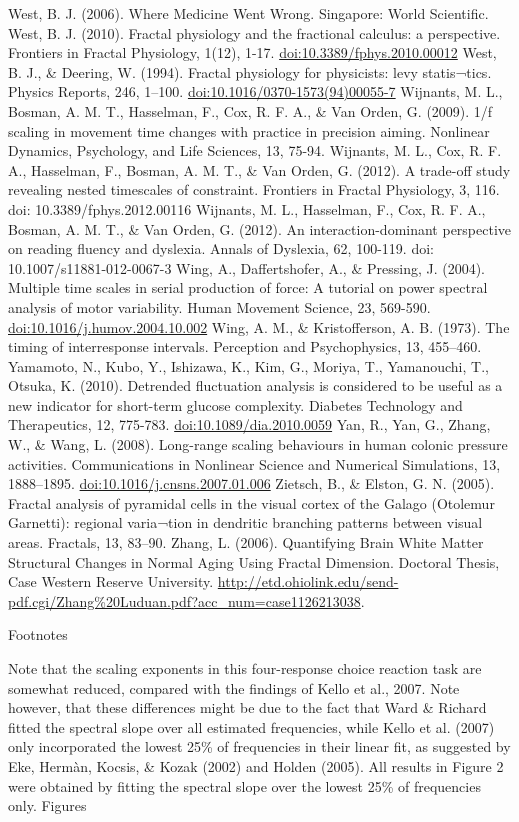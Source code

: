 \documentclass[12pt,]{book}
\begin{document}
West, B. J. (2006). Where Medicine Went Wrong. Singapore: World Scientific.
West, B. J. (2010). Fractal physiology and the fractional calculus: a perspective. Frontiers in Fractal Physiology, 1(12), 1-17. \url{doi:10.3389/fphys.2010.00012}
West, B. J., \& Deering, W. (1994). Fractal physiology for physicists: levy statis¬tics. Physics Reports, 246, 1--100. \url{doi:10.1016/0370-1573(94)00055-7}
Wijnants, M. L., Bosman, A. M. T., Hasselman, F., Cox, R. F. A., \& Van Orden, G. (2009). 1/f scaling in movement time changes with practice in precision aiming. Nonlinear Dynamics, Psychology, and Life Sciences, 13, 75-94.
Wijnants, M. L., Cox, R. F. A., Hasselman, F., Bosman, A. M. T., \& Van Orden, G. (2012). A trade-off study revealing nested timescales of constraint. Frontiers in Fractal Physiology, 3, 116. doi: 10.3389/fphys.2012.00116
Wijnants, M. L., Hasselman, F., Cox, R. F. A., Bosman, A. M. T., \& Van Orden, G. (2012). An interaction-dominant perspective on reading fluency and dyslexia. Annals of Dyslexia, 62, 100-119. doi: 10.1007/s11881-012-0067-3
Wing, A., Daffertshofer, A., \& Pressing, J. (2004). Multiple time scales in serial production of force: A tutorial on power spectral analysis of motor variability. Human Movement Science, 23, 569-590. \url{doi:10.1016/j.humov.2004.10.002}
Wing, A. M., \& Kristofferson, A. B. (1973). The timing of interresponse intervals. Perception and Psychophysics, 13, 455--460.
Yamamoto, N., Kubo, Y., Ishizawa, K., Kim, G., Moriya, T., Yamanouchi, T., Otsuka, K. (2010). Detrended fluctuation analysis is considered to be useful as a new indicator for short-term glucose complexity. Diabetes Technology and Therapeutics, 12, 775-783. \url{doi:10.1089/dia.2010.0059}
Yan, R., Yan, G., Zhang, W., \& Wang, L. (2008). Long-range scaling behaviours in human colonic pressure activities. Communications in Nonlinear Science and Numerical Simulations, 13, 1888--1895. \url{doi:10.1016/j.cnsns.2007.01.006}
Zietsch, B., \& Elston, G. N. (2005). Fractal analysis of pyramidal cells in the visual cortex of the Galago (Otolemur Garnetti): regional varia¬tion in dendritic branching patterns between visual areas. Fractals, 13, 83--90.
Zhang, L. (2006). Quantifying Brain White Matter Structural Changes in Normal Aging Using Fractal Dimension. Doctoral Thesis, Case Western Reserve University. \url{http://etd.ohiolink.edu/send-pdf.cgi/Zhang\%20Luduan.pdf?acc_num=case1126213038}.

Footnotes

Note that the scaling exponents in this four-response choice reaction task are somewhat reduced, compared with the findings of Kello et al., 2007. Note however, that these differences might be due to the fact that Ward \& Richard fitted the spectral slope over all estimated frequencies, while Kello et al. (2007) only incorporated the lowest 25\% of frequencies in their linear fit, as suggested by Eke, Hermàn, Kocsis, \& Kozak (2002) and Holden (2005). All results in Figure 2 were obtained by fitting the spectral slope over the lowest 25\% of frequencies only.
Figures
\end{document}
